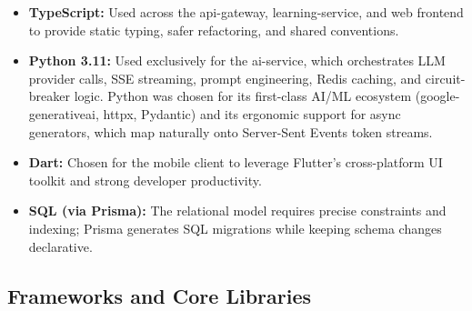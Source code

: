 \begin{itemize}
    \item \textbf{TypeScript:} Used across the api-gateway, learning-service, and web frontend to provide static typing, safer refactoring, and shared conventions.
    \item \textbf{Python 3.11:} Used exclusively for the ai-service, which orchestrates LLM provider calls, SSE streaming, prompt engineering, Redis caching, and circuit-breaker logic. Python was chosen for its first-class AI/ML ecosystem (google-generativeai, httpx, Pydantic) and its ergonomic support for async generators, which map naturally onto Server-Sent Events token streams.
    \item \textbf{Dart:} Chosen for the mobile client to leverage Flutter's cross-platform UI toolkit and strong developer productivity.
    \item \textbf{SQL (via Prisma):} The relational model requires precise constraints and indexing; Prisma generates SQL migrations while keeping schema changes declarative.
\end{itemize}

\subsection{Frameworks and Core Libraries}

